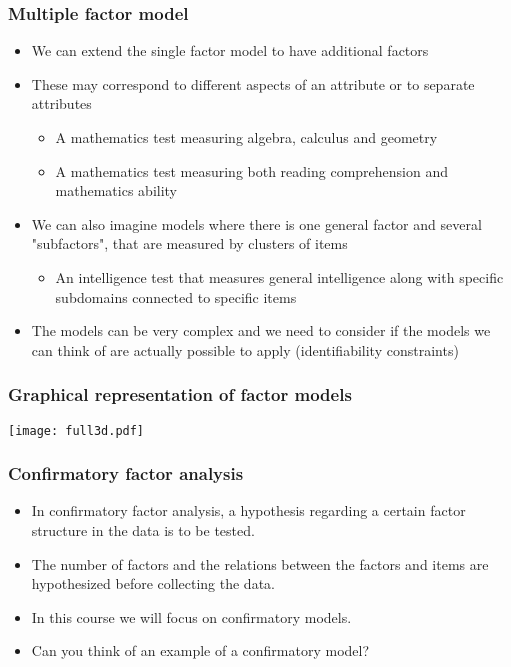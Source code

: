 \documentclass[compress]{beamer}
\begin{document}
\begin{frame}[fragile]
\frametitle{Multiple factor model}
\begin{itemize}
\item We can extend the single factor model to have additional factors
\item These may correspond to different aspects of an attribute or to separate attributes
\begin{itemize}
\item A mathematics test measuring algebra, calculus and geometry
\item A mathematics test measuring both reading comprehension and mathematics ability
\end{itemize}
\item We can also imagine models where there is one general factor and several "subfactors", that are measured by clusters of items
\begin{itemize}
\item An intelligence test that measures general intelligence along with specific subdomains connected to specific items
\end{itemize}
\item The models can be very complex and we need to consider if the models we can think of are actually possible to apply (identifiability constraints)
\end{itemize}
\end{frame}

\begin{frame}[fragile]
\frametitle{Graphical representation of factor models}
\texttt{[image: full3d.pdf]}
\end{frame}

\begin{frame}[fragile]
\frametitle{Confirmatory factor analysis}
\begin{itemize}
\item In confirmatory factor analysis, a hypothesis regarding a certain factor structure in the data is to be tested. 
\item The number of factors and the relations between the factors and items are hypothesized before collecting the data.
\item In this course we will focus on confirmatory models.
\item {Can you think of an example of a confirmatory model?} 
\end{itemize}
\end{frame}
\end{document}
